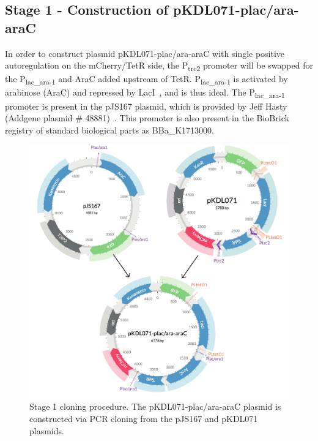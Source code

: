 \subsection{Stage 1 - Construction of pKDL071-plac/ara-araC}

In order to construct plasmid pKDL071-plac/ara-araC with single positive autoregulation on the mCherry/TetR side, the P\textsubscript{trc2} promoter will be swapped for the P\textsubscript{lac\_ara-1} and AraC added upstream of TetR. P\textsubscript{lac\_ara-1} is activated by arabinose (AraC) and repressed by LacI~\autocite{Lutz:1997ti}, and is thus ideal. The P\textsubscript{lac\_ara-1} promoter is present in the pJS167 plasmid, which is provided by Jeff Hasty (Addgene plasmid \# 48881)~\autocite{Stricker:2008jqa}. This promoter is also present in the BioBrick registry of standard biological parts as BBa\_K1713000. 



\begin{figure}[t]
	\begin{center}
		\includegraphics[scale=0.7]{../../chapters/chapterDesignSwitches/images/stage1_cloning.pdf}
		\caption[Stage 1 cloning procedure.]{\label{fig:stage1}Stage 1 cloning procedure. The pKDL071-plac/ara-araC plasmid is constructed via PCR cloning from the pJS167 and pKDL071 plasmids.}
	\end{center}
\end{figure}
\clearpage

